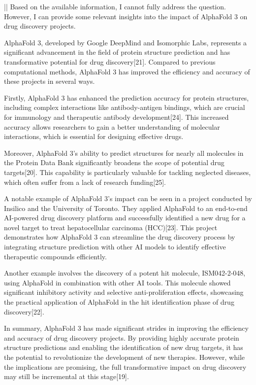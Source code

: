 \begin{showcase}[title=Topic: AlphaFold 3]
||
Based on the available information, I cannot fully address the question. However, I can provide some relevant insights into the impact of AlphaFold 3 on drug discovery projects.

AlphaFold 3, developed by Google DeepMind and Isomorphic Labs, represents a significant advancement in the field of protein structure prediction and has transformative potential for drug discovery[21]. Compared to previous computational methods, AlphaFold 3 has improved the efficiency and accuracy of these projects in several ways.

Firstly, AlphaFold 3 has enhanced the prediction accuracy for protein structures, including complex interactions like antibody-antigen bindings, which are crucial for immunology and therapeutic antibody development[24]. This increased accuracy allows researchers to gain a better understanding of molecular interactions, which is essential for designing effective drugs.

Moreover, AlphaFold 3's ability to predict structures for nearly all molecules in the Protein Data Bank significantly broadens the scope of potential drug targets[20]. This capability is particularly valuable for tackling neglected diseases, which often suffer from a lack of research funding[25].

A notable example of AlphaFold 3's impact can be seen in a project conducted by Insilico and the University of Toronto. They applied AlphaFold to an end-to-end AI-powered drug discovery platform and successfully identified a new drug for a novel target to treat hepatocellular carcinoma (HCC)[23]. This project demonstrates how AlphaFold 3 can streamline the drug discovery process by integrating structure prediction with other AI models to identify effective therapeutic compounds efficiently.

Another example involves the discovery of a potent hit molecule, ISM042-2-048, using AlphaFold in combination with other AI tools. This molecule showed significant inhibitory activity and selective anti-proliferation effects, showcasing the practical application of AlphaFold in the hit identification phase of drug discovery[22].

In summary, AlphaFold 3 has made significant strides in improving the efficiency and accuracy of drug discovery projects. By providing highly accurate protein structure predictions and enabling the identification of new drug targets, it has the potential to revolutionize the development of new therapies. However, while the implications are promising, the full transformative impact on drug discovery may still be incremental at this stage[19].


\end{showcase}
